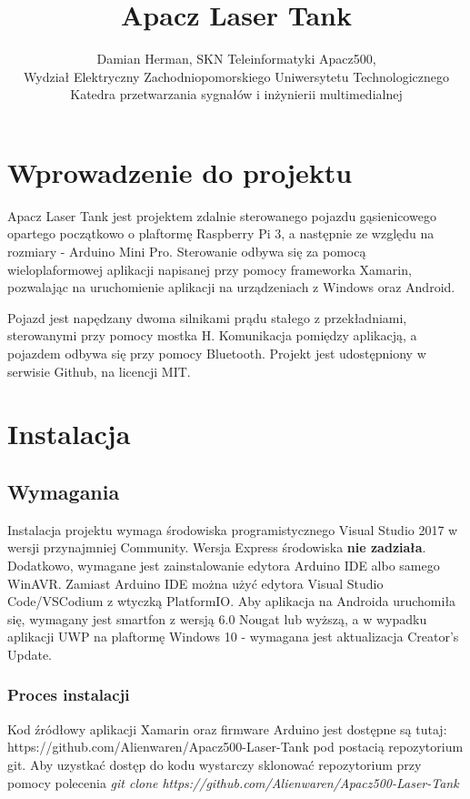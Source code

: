 \documentclass{report}
\author{Damian Herman, SKN Teleinformatyki Apacz500, \\ Wydział Elektryczny Zachodniopomorskiego Uniwersytetu Technologicznego \\Katedra przetwarzania sygnałów i inżynierii multimedialnej}
\title{Apacz Laser Tank}
\begin{document}
    
    \maketitle
    \chapter{Wprowadzenie do projektu}
        Apacz Laser Tank jest projektem zdalnie sterowanego pojazdu gąsienicowego opartego początkowo o plaftormę Raspberry Pi 3, a następnie ze względu na rozmiary - 
        Arduino Mini Pro. Sterowanie odbywa się za pomocą wieloplaformowej aplikacji napisanej przy pomocy frameworka Xamarin, pozwalając na uruchomienie aplikacji na urządzeniach 
        z Windows oraz Android. 

        Pojazd jest napędzany dwoma silnikami prądu stałego z przekładniami, sterowanymi przy pomocy mostka H. Komunikacja pomiędzy aplikacją, a pojazdem odbywa się przy pomocy Bluetooth.
        Projekt jest udostępniony w serwisie Github, na licencji MIT.
    \chapter{Instalacja}
        \section{Wymagania}
            Instalacja projektu wymaga środowiska programistycznego Visual Studio 2017 w wersji przynajmniej Community. Wersja Express środowiska \textbf{nie zadziała}.  
            Dodatkowo, wymagane jest zainstalowanie edytora Arduino IDE albo samego WinAVR. Zamiast Arduino IDE można użyć edytora Visual Studio Code/VSCodium z wtyczką PlatformIO.
            Aby aplikacja na Androida uruchomiła się, wymagany jest smartfon z wersją 6.0 Nougat lub wyższą, a w wypadku aplikacji UWP na plaftormę Windows 10 - wymagana jest aktualizacja Creator's Update.
        \subsection{Proces instalacji}
        Kod źródłowy aplikacji Xamarin oraz firmware Arduino jest dostępne są tutaj: https://github.com/Alienwaren/Apacz500-Laser-Tank pod postacią repozytorium git.
        Aby uzystkać dostęp do kodu wystarczy sklonować repozytorium przy pomocy polecenia \textit{git clone https://github.com/Alienwaren/Apacz500-Laser-Tank}
\end{document}
